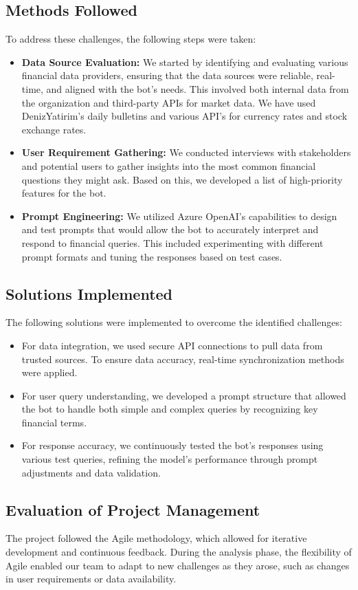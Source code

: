 \documentclass[a4paper,12pt]{report}
\begin{document}
\subsection*{Methods Followed}
To address these challenges, the following steps were taken:
\begin{itemize}
    \item \textbf{Data Source Evaluation:} We started by identifying and evaluating various financial data providers, ensuring that the data sources were reliable, real-time, and aligned with the bot's needs. This involved both internal data from the organization and third-party APIs for market data. We have used DenizYatirim's daily bulletins and various API's for currency rates and stock exchange rates.
    \item \textbf{User Requirement Gathering:} We conducted interviews with stakeholders and potential users to gather insights into the most common financial questions they might ask. Based on this, we developed a list of high-priority features for the bot.
    \item \textbf{Prompt Engineering:} We utilized Azure OpenAI’s capabilities to design and test prompts that would allow the bot to accurately interpret and respond to financial queries. This included experimenting with different prompt formats and tuning the responses based on test cases.
\end{itemize}

\subsection*{Solutions Implemented}
The following solutions were implemented to overcome the identified challenges:
\begin{itemize}
    \item For data integration, we used secure API connections to pull data from trusted sources. To ensure data accuracy, real-time synchronization methods were applied.
    \item For user query understanding, we developed a prompt structure that allowed the bot to handle both simple and complex queries by recognizing key financial terms.
    \item For response accuracy, we continuously tested the bot’s responses using various test queries, refining the model's performance through prompt adjustments and data validation.
\end{itemize}

\subsection*{Evaluation of Project Management}
The project followed the Agile methodology, which allowed for iterative development and continuous feedback. During the analysis phase, the flexibility of Agile enabled our team to adapt to new challenges as they arose, such as changes in user requirements or data availability.
\end{document}
